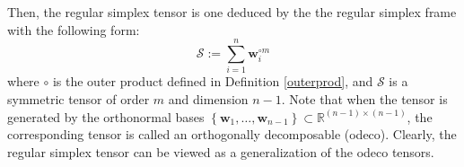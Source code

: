 		
		Then,  the  regular  simplex  tensor  is   one  deduced  by  the  the  regular  simplex   frame  with  the  following   form:
		\begin{equation}\label{simplextensor}
		\mathcal{S}:=\sum_{i=1}^{n} \mathbf{w}_{i}^{\circ m}
		\end{equation}
		where $\circ$ is the outer product  defined  in Definition \ref{outerprod}, 
and  	$\mathcal{S}
	$ is  a   symmetric  tensor of order
		$ m $
		and dimension
		$ n-1$.   
		Note that
		when the tensor is generated by the orthonormal bases
		$\left\{\mathbf{w}_{1}, \ldots, \mathbf{w}_{n-1}\right\} \subset \mathbb{R}^{(n-1) \times (n-1)}$,
		the corresponding tensor is called an orthogonally  decomposable (odeco).
		Clearly, the regular simplex tensor can be viewed as a generalization of the odeco tensors. 
	
